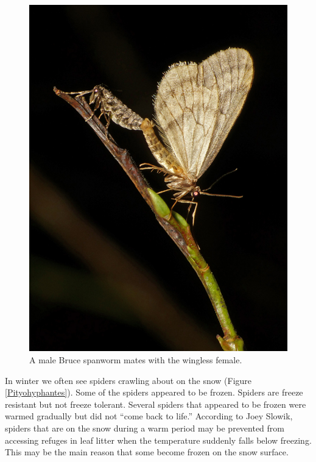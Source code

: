 \begin{multicols}{2}
\begin{figure}[H]
\begin{center}
\vspace{2mm}
\includegraphics[width=\textwidth]{img/bruce_spanworm.jpg}
\caption{A male Bruce spanworm mates with the wingless female.}
\label{bruce_spanworm}
\end{center}
\end{figure}

In winter we often see spiders crawling about on the snow (Figure \ref{Pityohyphantes}). Some of the spiders appeared to be frozen. Spiders are freeze resistant but not freeze tolerant. Several spiders that appeared to be frozen were warmed gradually but did not ``come back to life.'' According to Joey Slowik, spiders that are on the snow during a warm period may be prevented from accessing refuges in leaf litter when the temperature suddenly falls below freezing. This may be the main reason that some become frozen on the snow surface.





\end{multicols}
